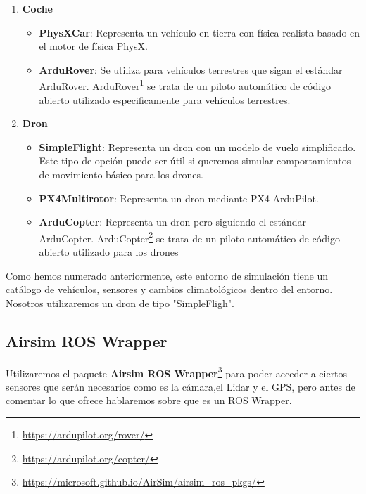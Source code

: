 \begin{enumerate}
  \item \textbf{Coche}
    \begin{itemize}
      \item \textbf{PhysXCar}: Representa un vehículo en tierra con física realista basado en el motor de física PhysX.
      \item \textbf{ArduRover}: Se utiliza para vehículos terrestres que sigan el estándar ArduRover. ArduRover\footnote{\url{https://ardupilot.org/rover/}} 
      se trata de un piloto automático de código abierto utilizado especificamente para vehículos terrestres.
      \newline
    \end{itemize}
    
  \item \textbf{Dron}
    \begin{itemize}
      \item \textbf{SimpleFlight}: Representa un dron con un modelo de vuelo simplificado. Este tipo de opción puede ser útil si queremos simular comportamientos 
      de movimiento básico para los drones.
      \item \textbf{PX4Multirotor}: Representa un dron mediante PX4 ArduPilot. 
      \item \textbf{ArduCopter}: Representa un dron pero siguiendo el estándar ArduCopter. ArduCopter\footnote{\url{https://ardupilot.org/copter/}} 
      se trata de un piloto automático de código abierto utilizado para los drones 
    \end{itemize}
  
\end{enumerate}

Como hemos numerado anteriormente, este entorno de simulación tiene un catálogo de vehículos, sensores y
cambios climatológicos dentro del entorno. Nosotros utilizaremos un dron de tipo "SimpleFligh". 

\subsection{Airsim ROS Wrapper}
\label{sec:wrapper}
Utilizaremos el paquete \textbf{Airsim ROS Wrapper}\footnote{\url{https://microsoft.github.io/AirSim/airsim_ros_pkgs/}} para poder acceder a ciertos sensores 
que serán necesarios como es la cámara,el Lidar y el GPS, pero antes de comentar lo que ofrece hablaremos sobre que es un ROS Wrapper. \newline

